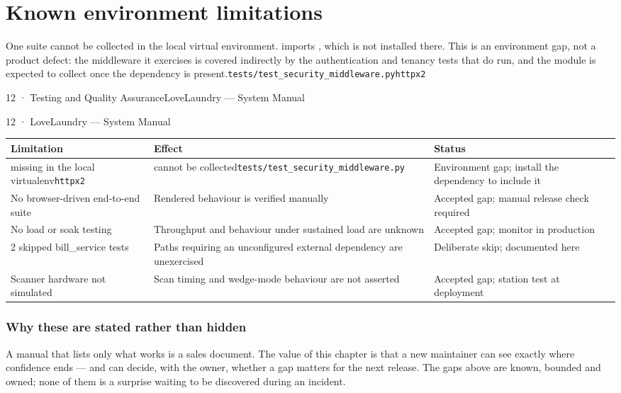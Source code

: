\documentclass[11pt,a4paper,oneside]{book}
\begin{document}
\section*{Known environment limitations}
One suite cannot be collected in the local virtual environment.  imports , which is not installed there. This is an environment gap, not a product defect: the middleware it exercises is covered indirectly by the authentication and tenancy tests that do run, and the module is expected to collect once the dependency is present.\texttt{tests/test\_security\_middleware.py}\texttt{httpx2}

12 · Testing and Quality AssuranceLoveLaundry — System Manual

12 · LoveLaundry — System Manual

\begin{center}\small
\begin{tabularx}{\linewidth}{|X|X|X|}
\hline
\rowcolor{lightgrey}
\textbf{Limitation} & \textbf{Effect} & \textbf{Status} \\ \hline
missing in the local virtualenv\texttt{httpx2} & cannot be collected\texttt{tests/test\_security\_middleware.py} & Environment gap; install the dependency to include it \\ \hline
No browser-driven end-to-end suite & Rendered behaviour is verified manually & Accepted gap; manual release check required \\ \hline
No load or soak testing & Throughput and behaviour under sustained load are unknown & Accepted gap; monitor in production \\ \hline
2 skipped bill\_service tests & Paths requiring an unconfigured external dependency are unexercised & Deliberate skip; documented here \\ \hline
Scanner hardware not simulated & Scan timing and wedge-mode behaviour are not asserted & Accepted gap; station test at deployment \\ \hline
\end{tabularx}
\end{center}
\subsubsection*{Why these are stated rather than hidden}
A manual that lists only what works is a sales document. The value of this chapter is that a new maintainer can see exactly where confidence ends — and can decide, with the owner, whether a gap matters for the next release. The gaps above are known, bounded and owned; none of them is a surprise waiting to be discovered during an incident.
\end{document}
